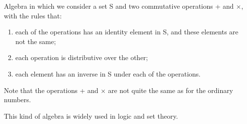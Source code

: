 Algebra in which we consider a set S and two commutative 
operations + and $\times$, with the rules that:
\par
\begin{enumerate}
\item each of the operations has an identity element in S, and these
elements are not the same;
\item each operation is distributive over the other;
\item each element has an inverse in S under each of the operations.
\end{enumerate}
Note that the operations + and $\times$ are not quite the same as for the ordinary numbers.
\par
This kind of algebra is widely used in logic and set theory.